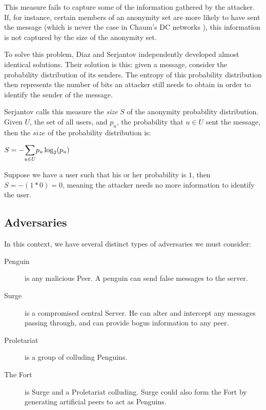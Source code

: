 \documentclass[twocolumn,11pt,english]{article}
\begin{document}
This measure fails to capture some of the information gathered by the attacker. If, for instance, certain members of an anonymity set are more likely to have sent the message (which is never the case in Chaum's DC networks \cite{chaum-dc}), this information is not captured by the size of the anonymity set. 

To solve this problem, Diaz \cite{Diaz02} and Serjantov \cite{Serj02} independently developed almost identical solutions. Their solution is this: given a message, consider the probability distribution of its senders. The entropy of this probability distribution then represents the number of bits an attacker still needs to obtain in order to identify the sender of the message. 

Serjantov \cite{Serj02} calls this measure the \textit{size} $S$ of the anonymity probability distribution. Given $U$, the set of all users, and $p_u$, the probability that $u \in U$ sent the message, then the $size$ of the probability distribution is:

\begin{center}
  $ S = - \mathlarger{\sum}\limits_{u \in U} p_u \log_2(p_u)$
\end{center}

Suppose we have a user such that his or her probability is $1$, then  $S = -(1 * 0) = 0$, meaning the attacker needs no more information to identify the user. 


\subsection{Adversaries}
In this context, we have several distinct types of adversaries we must consider:
\begin{description}
\item[Penguin] 
  is any malicious Peer. A penguin can send false messages to the server. 
\item[Surge] 
  is a compromised central Server. He can alter and intercept any messages passing through, and can provide bogus information to any peer.
\item[Proletariat] 
  is a group of colluding Penguins.
\item[The Fort] 
  is Surge and a Proletariat colluding. Surge could also form the Fort by generating artificial peers to act as Penguins.
\end{description}
\end{document}
